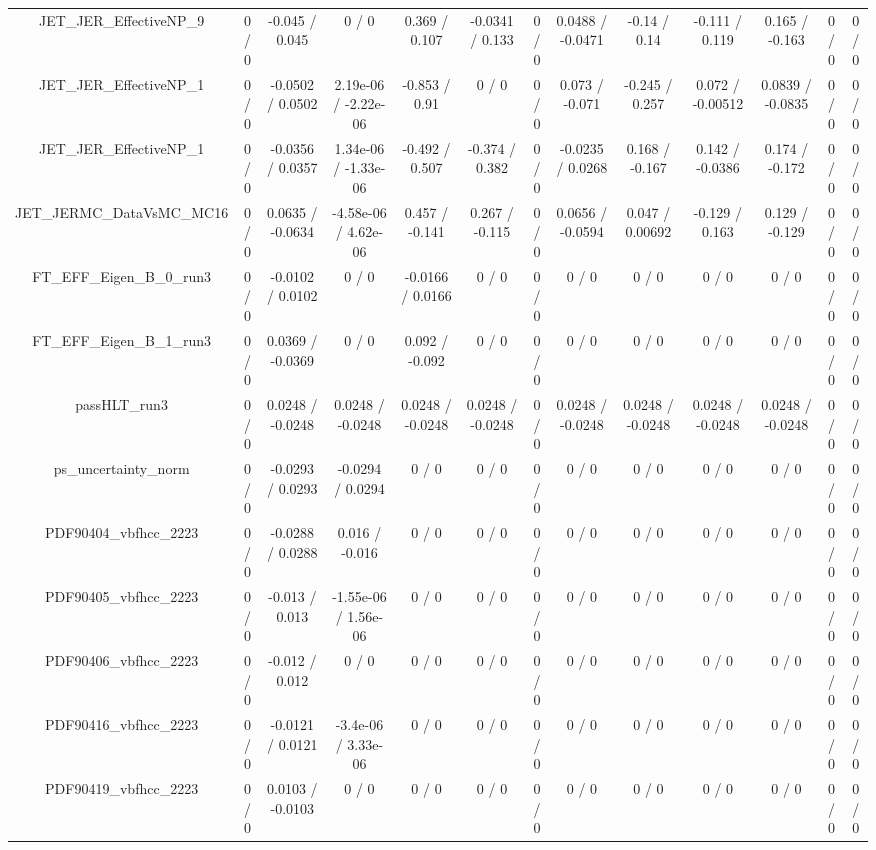 \documentclass[10pt]{article}
\begin{document}
\begin{table}[htbp]
\begin{center}
\begin{tabular}{|c|c|c|c|c|c|c|c|c|c|c|c|c|}
  JET_JER_EffectiveNP_9 & 0 / 0 & -0.045 / 0.045 & 0 / 0 & 0.369 / 0.107 & -0.0341 / 0.133 & 0 / 0 & 0.0488 / -0.0471 & -0.14 / 0.14 & -0.111 / 0.119 & 0.165 / -0.163 & 0 / 0 & 0 / 0 \\ 
  JET_JER_EffectiveNP_1 & 0 / 0 & -0.0502 / 0.0502 & 2.19e-06 / -2.22e-06 & -0.853 / 0.91 & 0 / 0 & 0 / 0 & 0.073 / -0.071 & -0.245 / 0.257 & 0.072 / -0.00512 & 0.0839 / -0.0835 & 0 / 0 & 0 / 0 \\ 
  JET_JER_EffectiveNP_1 & 0 / 0 & -0.0356 / 0.0357 & 1.34e-06 / -1.33e-06 & -0.492 / 0.507 & -0.374 / 0.382 & 0 / 0 & -0.0235 / 0.0268 & 0.168 / -0.167 & 0.142 / -0.0386 & 0.174 / -0.172 & 0 / 0 & 0 / 0 \\ 
  JET_JERMC_DataVsMC_MC16 & 0 / 0 & 0.0635 / -0.0634 & -4.58e-06 / 4.62e-06 & 0.457 / -0.141 & 0.267 / -0.115 & 0 / 0 & 0.0656 / -0.0594 & 0.047 / 0.00692 & -0.129 / 0.163 & 0.129 / -0.129 & 0 / 0 & 0 / 0 \\ 
  FT_EFF_Eigen_B_0_run3 & 0 / 0 & -0.0102 / 0.0102 & 0 / 0 & -0.0166 / 0.0166 & 0 / 0 & 0 / 0 & 0 / 0 & 0 / 0 & 0 / 0 & 0 / 0 & 0 / 0 & 0 / 0 \\ 
  FT_EFF_Eigen_B_1_run3 & 0 / 0 & 0.0369 / -0.0369 & 0 / 0 & 0.092 / -0.092 & 0 / 0 & 0 / 0 & 0 / 0 & 0 / 0 & 0 / 0 & 0 / 0 & 0 / 0 & 0 / 0 \\ 
  passHLT_run3 & 0 / 0 & 0.0248 / -0.0248 & 0.0248 / -0.0248 & 0.0248 / -0.0248 & 0.0248 / -0.0248 & 0 / 0 & 0.0248 / -0.0248 & 0.0248 / -0.0248 & 0.0248 / -0.0248 & 0.0248 / -0.0248 & 0 / 0 & 0 / 0 \\ 
  ps_uncertainty_norm & 0 / 0 & -0.0293 / 0.0293 & -0.0294 / 0.0294 & 0 / 0 & 0 / 0 & 0 / 0 & 0 / 0 & 0 / 0 & 0 / 0 & 0 / 0 & 0 / 0 & 0 / 0 \\ 
  PDF90404_vbfhcc_2223 & 0 / 0 & -0.0288 / 0.0288 & 0.016 / -0.016 & 0 / 0 & 0 / 0 & 0 / 0 & 0 / 0 & 0 / 0 & 0 / 0 & 0 / 0 & 0 / 0 & 0 / 0 \\ 
  PDF90405_vbfhcc_2223 & 0 / 0 & -0.013 / 0.013 & -1.55e-06 / 1.56e-06 & 0 / 0 & 0 / 0 & 0 / 0 & 0 / 0 & 0 / 0 & 0 / 0 & 0 / 0 & 0 / 0 & 0 / 0 \\ 
  PDF90406_vbfhcc_2223 & 0 / 0 & -0.012 / 0.012 & 0 / 0 & 0 / 0 & 0 / 0 & 0 / 0 & 0 / 0 & 0 / 0 & 0 / 0 & 0 / 0 & 0 / 0 & 0 / 0 \\ 
  PDF90416_vbfhcc_2223 & 0 / 0 & -0.0121 / 0.0121 & -3.4e-06 / 3.33e-06 & 0 / 0 & 0 / 0 & 0 / 0 & 0 / 0 & 0 / 0 & 0 / 0 & 0 / 0 & 0 / 0 & 0 / 0 \\ 
  PDF90419_vbfhcc_2223 & 0 / 0 & 0.0103 / -0.0103 & 0 / 0 & 0 / 0 & 0 / 0 & 0 / 0 & 0 / 0 & 0 / 0 & 0 / 0 & 0 / 0 & 0 / 0 & 0 / 0 \\ 

\end{tabular}
\end{center}
\end{table}
\end{document}
